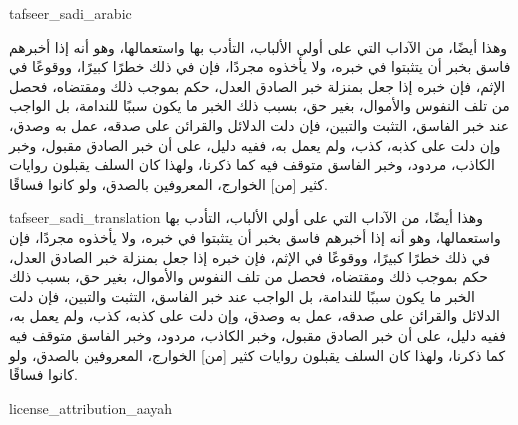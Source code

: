 \begin{taggedblock}{tafseer_sadi_arabic}
\begin{Arabic}
وهذا أيضًا، من الآداب التي على أولي الألباب، التأدب بها واستعمالها، وهو أنه إذا أخبرهم فاسق بخبر أن يتثبتوا في خبره، ولا يأخذوه مجردًا، فإن في ذلك خطرًا كبيرًا، ووقوعًا في الإثم، فإن خبره إذا جعل بمنزلة خبر الصادق العدل، حكم بموجب ذلك ومقتضاه، فحصل من تلف النفوس والأموال، بغير حق، بسبب ذلك الخبر ما يكون سببًا للندامة، بل الواجب عند خبر الفاسق، التثبت والتبين، فإن دلت الدلائل والقرائن على صدقه، عمل به وصدق، وإن دلت على كذبه، كذب، ولم يعمل به، ففيه دليل، على أن خبر الصادق مقبول، وخبر الكاذب، مردود، وخبر الفاسق متوقف فيه كما ذكرنا، ولهذا كان السلف يقبلون روايات كثير
[من]
الخوارج، المعروفين بالصدق، ولو كانوا فساقًا.
\end{Arabic}
\end{taggedblock}
\begin{taggedblock}{tafseer_sadi_translation}
وهذا أيضًا، من الآداب التي على أولي الألباب، التأدب بها واستعمالها، وهو أنه إذا أخبرهم فاسق بخبر أن يتثبتوا في خبره، ولا يأخذوه مجردًا، فإن في ذلك خطرًا كبيرًا، ووقوعًا في الإثم، فإن خبره إذا جعل بمنزلة خبر الصادق العدل، حكم بموجب ذلك ومقتضاه، فحصل من تلف النفوس والأموال، بغير حق، بسبب ذلك الخبر ما يكون سببًا للندامة، بل الواجب عند خبر الفاسق، التثبت والتبين، فإن دلت الدلائل والقرائن على صدقه، عمل به وصدق، وإن دلت على كذبه، كذب، ولم يعمل به، ففيه دليل، على أن خبر الصادق مقبول، وخبر الكاذب، مردود، وخبر الفاسق متوقف فيه كما ذكرنا، ولهذا كان السلف يقبلون روايات كثير
[من]
الخوارج، المعروفين بالصدق، ولو كانوا فساقًا.
\end{taggedblock}
\begin{taggedblock}{license_attribution_aayah}

\end{taggedblock}
\begin{comment}
Please use the following for footnotes:- Sample\footnoteQ{Text of Qur'an footnote goes here.}.
Sample\footnoteT{Text of Tafseer footnote goes here.}.
\end{comment}